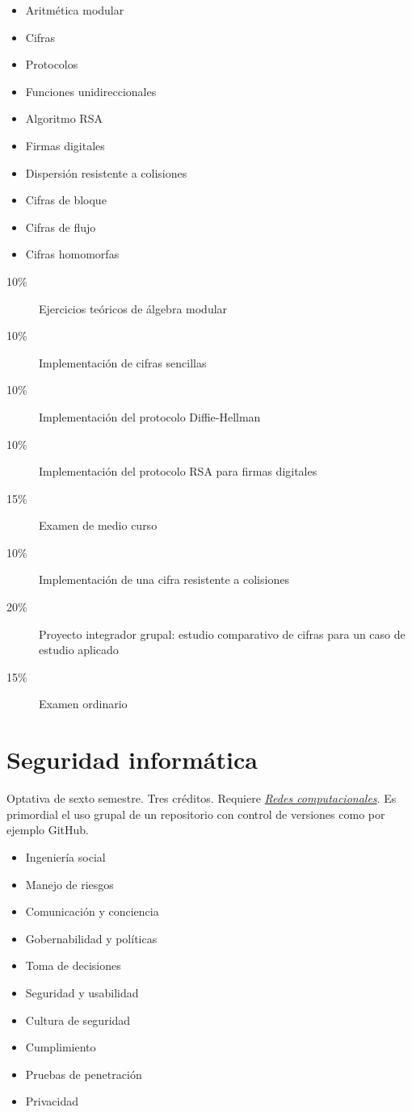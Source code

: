 \documentclass{article}
\begin{document}
\begin{multicols}{4}
\begin{itemize}
\item{Aritm\'{e}tica modular}
\item{Cifras}
\item{Protocolos}
\item{Funciones unidireccionales}
\item{Algoritmo RSA}
\item{Firmas digitales}
\item{Dispersi\'{o}n resistente a colisiones}
\item{Cifras de bloque}
\item{Cifras de flujo}
\item{Cifras homomorfas}
\end{itemize}

\begin{description}
\item[10\%]{Ejercicios te\'{o}ricos de \'{a}lgebra modular}
\item[10\%]{Implementaci\'{o}n de cifras sencillas}
\item[10\%]{Implementaci\'{o}n del protocolo Diffie-Hellman}
\item[10\%]{Implementaci\'{o}n del protocolo RSA para firmas digitales}
\item[15\%]{Examen de medio curso}  
\item[10\%]{Implementaci\'{o}n de una cifra resistente a colisiones}
\item[20\%]{Proyecto integrador grupal: estudio comparativo de cifras
  para un caso de estudio aplicado}
\item[15\%]{Examen ordinario}
\end{description}  

\vfill\null \columnbreak

\hypertarget{si}{\section*{Seguridad inform\'{a}tica}} 

Optativa de sexto semestre. Tres cr\'{e}ditos. Requiere
\hyperlink{rc}{\em Redes computacionales}. Es primordial el uso grupal
de un repositorio con control de versiones como por ejemplo GitHub.

\begin{itemize}
\item{Ingenier\'{i}a social}
\item{Manejo de riesgos}
\item{Comunicaci\'{o}n y conciencia}
\item{Gobernabilidad y pol\'{i}ticas}
\item{Toma de decisiones}
\item{Seguridad y usabilidad}
\item{Cultura de seguridad}
\item{Cumplimiento}
\item{Pruebas de penetraci\'{o}n}
\item{Privacidad}
\end{itemize}


\end{multicols}
\end{document}
